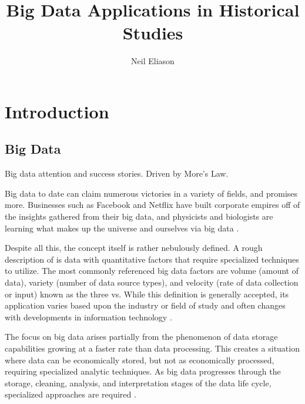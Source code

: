 \documentclass[sigconf]{acmart}
\begin{document}
\title{Big Data Applications in Historical Studies}


\author{Neil Eliason}

\renewcommand{\shortauthors}{N. Eliason}


\begin{abstract}

\end{abstract}



\maketitle



\section{Introduction}
\subsection{Big Data}
Big data attention and success stories. Driven by More's Law.

Big data to date can claim numerous victories in a variety of fields, and promises more. Businesses such as Facebook and Netflix have built corporate empires off of the insights gathered from their big data, and physicists and biologists are learning what makes up the universe and ourselves via big data \cite{bdsurvey}. 

Despite all this, the concept itself is rather nebulously defined. A rough description of is data with quantitative factors that require specialized techniques to utilize. The most commonly referenced big data factors are volume (amount of data), variety (number of data source types), and velocity (rate of data collection or input) known as the three vs. While this definition is generally accepted, its application varies based upon the industry or field of study and often changes with developments in information technology \cite{bdconcepts}.

The focus on big data arises partially from the phenomenon of data storage capabilities growing at a faster rate than data processing. This creates a situation where data can be economically stored, but not as economically processed, requiring specialized analytic techniques. As big data progresses through the storage, cleaning, analysis, and interpretation stages of the data life cycle, specialized approaches are required \cite{bdsurvey}.
\end{document}
